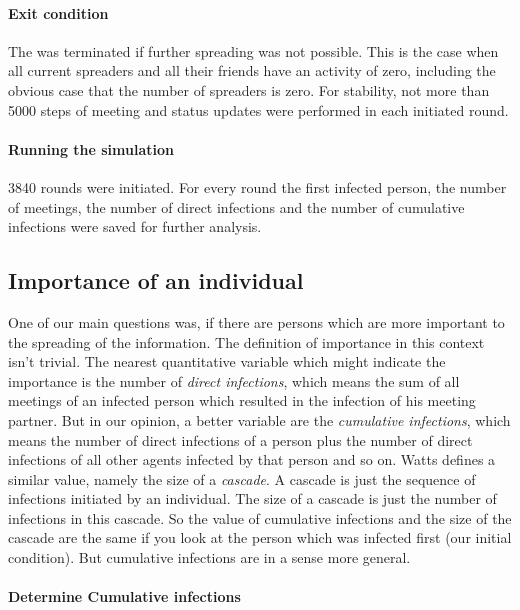 \paragraph{Exit condition}

The  was terminated if further spreading was not possible. This is the case when all current spreaders and all their friends have an activity of zero, including the obvious case that the number of spreaders is zero. For stability, not more than 5000 steps of meeting and status updates were performed in each initiated round.

\paragraph{Running the simulation}
3840 rounds were initiated. For every round the first infected person, the number of meetings, the number of direct infections and the number of cumulative infections were saved for further analysis.



\subsection{Importance of an individual}

One of our main questions was, if there are persons which are more important to the spreading of the information. The definition of importance in this context isn't trivial. The nearest quantitative variable which might indicate the importance is the number of \textit{direct infections}, which means the sum of all meetings of an infected person which resulted in the infection of his meeting partner. But in our opinion, a better variable are the \textit{cumulative infections}, which means the number of direct infections of a person plus the number of direct infections of all other agents infected by that person and so on. Watts \cite{influentials} defines a similar value, namely the size of a \textit{cascade}. A cascade is just the sequence of infections initiated by an individual. The size of a cascade is just the number of infections in this cascade. So the value of cumulative infections and the size of the cascade are the same if you look at the person which was infected first (our initial condition). But cumulative infections are in a sense more general. 

\paragraph{Determine Cumulative infections}

